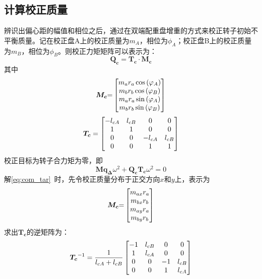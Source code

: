 \documentclass[
  lang=cn,
  degree=master,
  openany,oneside
]{nuaathesis}
\begin{document}
\subsection{计算校正质量}

辨识出偏心距的幅值和相位之后，通过在双端配重盘增重的方式来校正转子初始不平衡质量。记在校正盘A上的校正质量为$m_A$，相位为$\phi _A$；校正盘B上的校正质量为$m_B$，相位为$\phi _B$。则校正力矩矩阵可以表示为：
\begin{equation}
\boldsymbol{Q_c} = \boldsymbol{T_c} \cdot \boldsymbol{M_c}
\end{equation}
其中
\begin{equation}
\boldsymbol{M_c}{\rm{ = }}\left[ {\begin{matrix}
   {{m_a}{r_a}\cos \left( {{\varphi _A}} \right)}  \cr 
   {{m_b}{r_b}\cos \left( {{\varphi _B}} \right)}  \cr 
   {{m_a}{r_a}\sin \left( {{\varphi _A}} \right)}  \cr 
   {{m_b}{r_b}\sin \left( {{\varphi _B}} \right)}  \cr 

 \end{matrix} } \right]
\end{equation}
\begin{equation}
\boldsymbol{T_c} = \left[ {\begin{matrix}
   { - {l_{cA}}} & {{l_{cB}}} & 0 & 0  \cr 
   1 & 1 & 0 & 0  \cr 
   0 & 0 & { - {l_{cA}}} & {{l_{cB}}}  \cr 
   0 & 0 & 1 & 1  \cr 

 \end{matrix} } \right]
\end{equation}
校正目标为转子合力矩为零，即
\begin{equation}
\label{eq:com_tar}
\boldsymbol{M}\boldsymbol{q_{\Delta}}{\omega}^2 + \boldsymbol{Q_c}\boldsymbol{T_c}{\omega}^2 = 0
\end{equation}
解\autoref{eq:com_tar}~时，先令校正质量分布于正交方向$x$和$y$上，表示为
\begin{equation}
{\boldsymbol{M_c}}{\rm{ = }}\left[ {\begin{matrix}
   {{m_{ax}}{r_a}}  \cr 
   {{m_{bx}}{r_b}}  \cr 
   {{m_{ay}}{r_a}}  \cr 
   {{m_{by}}{r_b}}  \cr 

 \end{matrix} } \right]
\end{equation}
求出$\boldsymbol{T_c}$的逆矩阵为：
\begin{equation}
{\boldsymbol{T_c}}^{ - 1} = {1 \over {{l_{cA}} + {l_{cB}}}}\left[ {\begin{matrix}
   { - 1} & {{l_{cB}}} & 0 & 0  \cr 
   1 & {{l_{cA}}} & 0 & 0  \cr 
   0 & 0 & { - 1} & {{l_{cB}}}  \cr 
   0 & 0 & 1 & {{l_{cA}}}  \cr 

 \end{matrix} } \right]
\end{equation}
\end{document}
